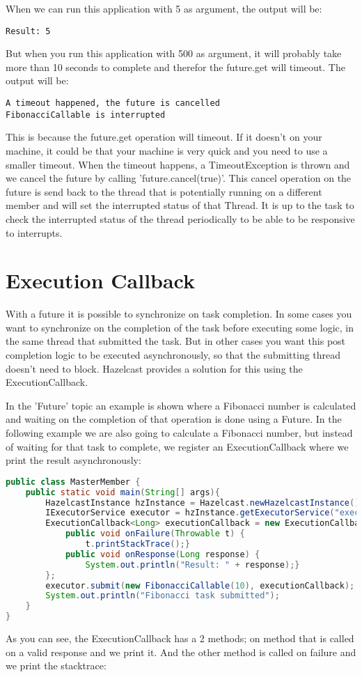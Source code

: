 When we can run this application with 5 as argument, the output will be: 
\begin{lstlisting}
Result: 5
\end{lstlisting}
But when you run this application with 500 as argument, it will probably take more than 10 seconds to complete and therefor the future.get will timeout. The output will be:
\begin{lstlisting}
A timeout happened, the future is cancelled
FibonacciCallable is interrupted
\end{lstlisting}
This is because the future.get operation will timeout. If it doesn't on your machine, it could be that your machine is very quick and you need to use a smaller timeout. When the timeout happens, a TimeoutException is thrown and we cancel the future by calling 'future.cancel(true)'. This cancel operation on the future is send back to the thread that is potentially running on a different member and will set the interrupted status of that Thread. It is up to the task to check the interrupted status of the thread periodically to be able to be responsive to interrupts.

\section{Execution Callback}
With a future it is possible to synchronize on task completion. In some cases you want to synchronize on the completion of the task before executing some logic, in the same thread that submitted the task. But in other cases you want this post completion logic to be executed asynchronously, so that the submitting thread doesn't need to block. Hazelcast provides a solution for this using the ExecutionCallback.

In the 'Future' topic an example is shown where a Fibonacci number is calculated and waiting on the completion of that operation is done using a Future. In the following example we are also going to calculate a Fibonacci number, but instead of waiting for that task to complete, we register an ExecutionCallback where we print the result asynchronously:
\begin{lstlisting}[language=java]
public class MasterMember {
    public static void main(String[] args){
        HazelcastInstance hzInstance = Hazelcast.newHazelcastInstance();
        IExecutorService executor = hzInstance.getExecutorService("executor");
        ExecutionCallback<Long> executionCallback = new ExecutionCallback<Long>() {
            public void onFailure(Throwable t) {
                t.printStackTrace();}
            public void onResponse(Long response) {
                System.out.println("Result: " + response);}
        };
        executor.submit(new FibonacciCallable(10), executionCallback);
        System.out.println("Fibonacci task submitted");
    }
}
\end{lstlisting}
As you can see, the ExecutionCallback has a 2 methods; on method that is called on a valid response and we print it. And the other method is called on failure and we print the stacktrace: 

